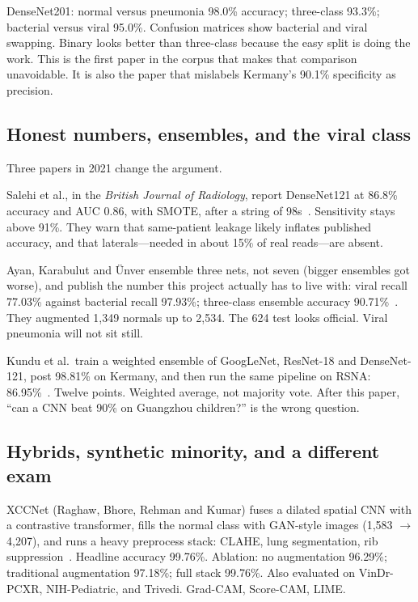 \documentclass[11pt,a4paper]{article}
\begin{document}
DenseNet201: normal versus pneumonia 98.0\% accuracy; three-class 93.3\%; bacterial versus viral 95.0\%. Confusion matrices show bacterial and viral swapping. Binary looks better than three-class because the easy split is doing the work. This is the first paper in the corpus that makes that comparison unavoidable. It is also the paper that mislabels Kermany's 90.1\% specificity as precision.

\subsection{Honest numbers, ensembles, and the viral class}
Three papers in 2021 change the argument.

Salehi et al., in the \textit{British Journal of Radiology}, report DenseNet121 at 86.8\% accuracy and AUC 0.86, with SMOTE, after a string of 98s~\cite{salehi2021}. Sensitivity stays above 91\%. They warn that same-patient leakage likely inflates published accuracy, and that laterals---needed in about 15\% of real reads---are absent.

Ayan, Karabulut and \"Unver ensemble three nets, not seven (bigger ensembles got worse), and publish the number this project actually has to live with: viral recall 77.03\% against bacterial recall 97.93\%; three-class ensemble accuracy 90.71\%~\cite{ayan2021}. They augmented 1{,}349 normals up to 2{,}534. The 624 test looks official. Viral pneumonia will not sit still.

Kundu et al.\ train a weighted ensemble of GoogLeNet, ResNet-18 and DenseNet-121, post 98.81\% on Kermany, and then run the same pipeline on RSNA: 86.95\%~\cite{kundu2021}. Twelve points. Weighted average, not majority vote. After this paper, ``can a CNN beat 90\% on Guangzhou children?'' is the wrong question.

\subsection{Hybrids, synthetic minority, and a different exam}
XCCNet (Raghaw, Bhore, Rehman and Kumar) fuses a dilated spatial CNN with a contrastive transformer, fills the normal class with GAN-style images (1{,}583 $\rightarrow$ 4{,}207), and runs a heavy preprocess stack: CLAHE, lung segmentation, rib suppression~\cite{raghaw2024}. Headline accuracy 99.76\%. Ablation: no augmentation 96.29\%; traditional augmentation 97.18\%; full stack 99.76\%. Also evaluated on VinDr-PCXR, NIH-Pediatric, and Trivedi. Grad-CAM, Score-CAM, LIME.
\end{document}
